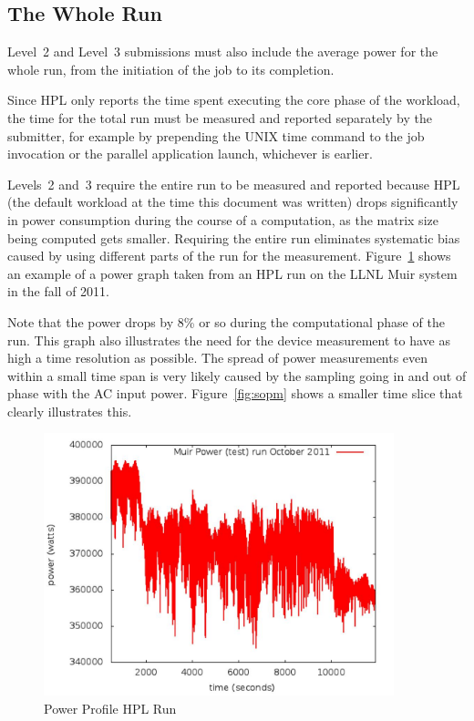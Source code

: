 \subsection{The Whole Run}
\noindent
Level~2 and Level~3 submissions must also include the average power for the whole run, from the initiation of the job to its completion.
\wl

\noindent
Since HPL only reports the time spent executing the core phase of the workload, the time for the total run must be measured and reported separately by the submitter, for example by prepending the UNIX time command to the job invocation or the parallel application launch, whichever is earlier.
\wl

\noindent
Levels~2 and~3 require the entire run to be measured and reported because HPL (the default workload at the time this document was written) drops significantly in power consumption during the course of a computation, as the matrix size being computed gets smaller.
Requiring the entire run eliminates systematic bias caused by using different parts of the run for the measurement.
Figure~\ref{fig:powprof} shows an example of a power graph taken from an HPL run on the LLNL Muir system in the fall of 2011.
\wl

\noindent
Note that the power drops by 8\% or so during the computational phase of the run.
This graph also illustrates the need for the device measurement to have as high a time resolution as possible.
The spread of power measurements even within a small time span is very likely caused by the sampling going in and out of phase with the AC input power.
Figure~\ref{fig:sopm} shows a smaller time slice that clearly illustrates this.
\wl


\begin{figure}
\centering
\includegraphics[width=4in]{fig3-1}
\caption{Power Profile HPL Run}
\label{fig:powprof}
\end{figure}

